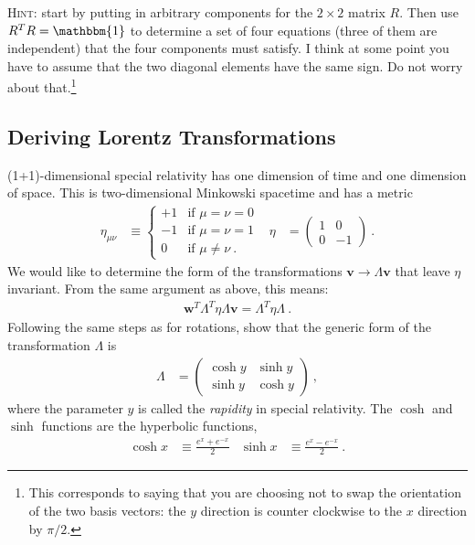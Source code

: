 \documentclass[12pt]{article}
\numberwithin{equation}{section}    %
\renewcommand{\vec}[1]{\mathbf{#1}} %
\begin{document}
\textsc{Hint:} start by putting in arbitrary components for the $2\times 2$ matrix $R$. Then use $R^T R = \mathbbm{1}$ to determine a set of four equations (three of them are independent) that the four components must satisfy. I think at some point you have to assume that the two diagonal elements have the same sign. Do not worry about that.\footnote{This corresponds to saying that you are choosing not to swap the orientation of the two basis vectors: the $y$ direction is counter clockwise to the $x$ direction by $\pi/2$.}


\subsection{Deriving Lorentz Transformations}

(1+1)-dimensional special relativity has one dimension of time and one dimension of space. This is two-dimensional Minkowski spacetime and has a metric
\begin{align}
	\eta_{\mu\nu} &\equiv 
	\begin{cases}
	+1 & \text{if $\mu=\nu=0$}
	\\
	-1 & \text{if $\mu=\nu=1$}
	\\
	0 & \text{if $\mu \neq \nu$} \ .
	\end{cases}
	&
	\eta  &=
	\begin{pmatrix}
		1 & 0 \\
		0 & -1
	\end{pmatrix} \ .
\end{align}
We would like to determine the form of the transformations $\vec{v}\to\Lambda\vec{v}$ that leave $\eta$ invariant. From the same argument as above, this means:
\begin{align}
	\vec{w}^T \Lambda^T \eta \Lambda \vec{v} = 
	\Lambda^T \eta \Lambda \ .
	\label{eq:Lorentz:def}
\end{align}
Following the same steps as for rotations, show that the generic form of the transformation $\Lambda$ is
\begin{align}
	\Lambda &=
	\begin{pmatrix}
		\cosh y & \sinh y\\
		\sinh y & \cosh y
	\end{pmatrix} \ ,
	\label{eq:Lorentz:hyperbolic}
\end{align}
where the parameter $y$ is called the \emph{rapidity} in special relativity. The $\cosh$ and $\sinh$ functions are the hyperbolic functions,
\begin{align}
	\cosh x &\equiv \frac{e^{x}+e^{-x}}{2}
	&
	\sinh x &\equiv \frac{e^{x}-e^{-x}}{2} \ .
\end{align}
\end{document}
